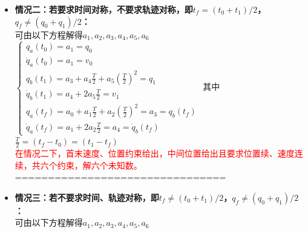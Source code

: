 \documentclass[../main.tex]{subfiles}
\begin{document}
\begin{enumerate}
\begin{enumerate}
{\begin{itemize}
\begin{enumerate}
                    \item \textbf{始末速度：}
                        \begin{itemize}
                            \item 若 $v_0=v_1$，则在 $t_f$ 处速度连续；
                            \item 若 $v_0\neq v_1$，则在 $t_f$ 处速度不连续；
                        \end{itemize}
                \end{enumerate}
                \textcolor{red}{在情况一下，首末速度、位置约束给出，中间位置给出且要求位置续，共六个约束，解六个未知数；中间点速度不要求连续，但当首末速度给的值相等时，恰好连续。}\\
            ================================   
             \item \textbf{情况二：若要求时间对称，不要求轨迹对称，即$t_f=(t_0+t_1)/2$，$q_f\neq(q_0+q_1)/2$：}
             \\可由以下方程解得$a_1,a_2,a_3,a_4,a_5,a_6$
            \( \left\{  \begin{array}{l} {{q}}_{a}\left( {t}_{0}\right)  = {a}_{1} = {q}_{0} \\  {\dot{q}}_{a}\left( {t}_{0}\right)  = {a}_{1} = {v}_{0} \\  {q}_{b}\left( {t}_{1}\right)  = {a}_{3} + {a}_{4}\frac{T}{2} + {a}_{5}{\left( \frac{T}{2}\right) }^{2} = {q}_{1} \\  {\dot{q}}_{b}\left( {t}_{1}\right)  = {a}_{4} + 2{a}_{5}\frac{T}{2} = {v}_{1} \\  {q}_{a}\left( {t}_{f}\right)  = {a}_{0} + {a}_{1}\frac{T}{2} + {a}_{2}{\left( \frac{T}{2}\right) }^{2} = {a}_{3} = {q}_{b}\left( t_f\right) \\  {\dot{q}}_{a}\left( {t}_{f}\right)  = {a}_{1} + 2{a}_{2}\frac{T}{2} = {a}_{4} = {\dot{q}}_{b}\left( {t}_{f}\right)  \end{array}\right. \)
            其中 \( \frac{T}{2} = \left( {{t}_{f} - {t}_{0}}\right)  = \left( {{t}_{1} - {t}_{f}}\right) \)\\
            \textcolor{red}{在情况二下，首末速度、位置约束给出，中间位置给出且要求位置续、速度连续，共六个约束，解六个未知数。}
            \\================================   
             \item \textbf{情况三：若不要求时间、轨迹对称，即$t_f\neq(t_0+t_1)/2$，$q_f\neq(q_0+q_1)/2$：}             
            \\可由以下方程解得$a_1,a_2,a_3,a_4,a_5,a_6$

\end{itemize}}
\end{enumerate}
\end{enumerate}
\end{document}
